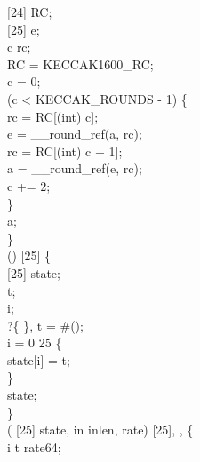  [24] RC;\\
 [25] e;\\
  c rc;\\
RC = KECCAK1600_RC;\\
c = 0;\\
  (c < KECCAK_ROUNDS - 1) \{\\
rc = RC[(int) c];\\
e = __round_ref(a, rc);\\
rc = RC[(int) c + 1];\\
a = __round_ref(e, rc);\\
c += 2;\\
\}\\
 a;\\
\}\\
  () \jasminarrow{}  [25] \{\\
 [25] state;\\
  t;\\
  i;\\
?\{
\}, t = \#();\\
 i = 0  25 \{\\
state[i] = t;\\
\}\\
 state;\\
\}\\
  ( [25] state,   in inlen,   rate) \jasminarrow{}  [25],  ,   \{\\
  i t rate64;\\

